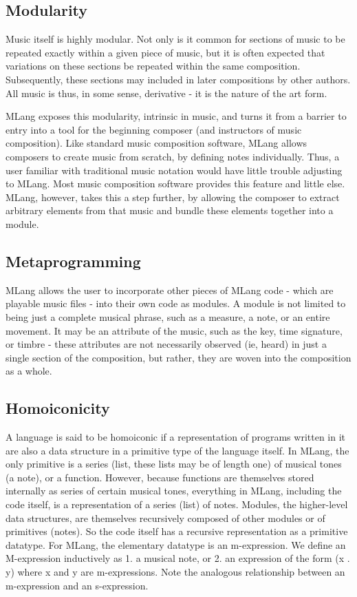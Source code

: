\documentclass[letterpaper,11pt]{article}
\begin{document}
\subsection{Modularity}
Music itself is highly modular. Not only is it common for sections of music to be repeated exactly within a given piece of music, but it is often expected that variations on these sections be repeated within the same composition. Subsequently, these sections may included in later compositions by other authors. All music is thus, in some sense, derivative - it is the nature of the art form.  

MLang exposes this modularity, intrinsic in music, and turns it from a barrier to entry into a tool for the beginning composer (and instructors of music composition). Like standard music composition software, MLang allows composers to create music from scratch, by defining notes individually.  Thus, a user familiar with traditional music notation would have little trouble adjusting to MLang. Most music composition software provides this feature and little else. MLang, however, takes this a step further, by allowing the composer to extract arbitrary elements from that music and bundle these elements together into a module.

\subsection{Metaprogramming}
MLang allows the user to incorporate other pieces of MLang code - which are playable music files - into their own code as modules. A module is not limited to being just a complete musical phrase, such as a measure, a note, or an entire movement. It may be an attribute of the music, such as the key, time signature, or timbre - these attributes are not necessarily observed (ie, heard) in just a single section of the composition, but rather, they are woven into the composition as a whole. 


\subsection{Homoiconicity}
A language is said to be homoiconic if a representation of programs written in it are also a data structure in a primitive type of the language itself. In MLang, the only primitive is a series (list, these lists may be of length one) of musical tones (a note), or a function. However, because functions are themselves stored internally as series of certain musical tones, everything in MLang, including the code itself, is a representation of a series (list) of notes. Modules, the higher-level data structures, are themselves recursively composed of other modules or of primitives (notes). So the code itself has a recursive representation as a primitive datatype. For MLang, the elementary datatype is an m-expression. We define an M-expression inductively as 
1. a musical note, or
2. an expression of the form (x . y) where x and y are m-expressions.
Note the analogous relationship between an m-expression and an s-expression.
\end{document}
